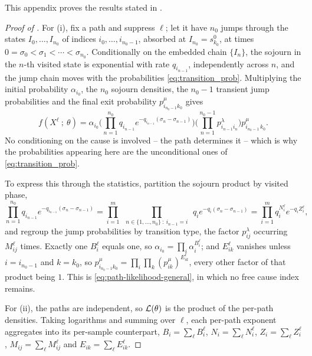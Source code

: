 \documentclass{article}
\begin{document}
This appendix proves the results stated in .

\begin{proof}[Proof of ]
For \textup{(i)}, fix a path and suppress $\ell$; let it have $n_0$ jumps through the states
$I_0,\ldots,I_{n_0}$ of indices $i_0,\ldots,i_{n_0-1}$, absorbed at $I_{n_0}=s^0_{k_0}$, at times
$0=\sigma_0<\sigma_1<\cdots<\sigma_{n_0}$. Conditionally on the embedded chain $\{I_n\}$, the sojourn
in the $n$-th visited state is exponential with rate $q_{i_{n-1}}$, independently across $n$, and the
jump chain moves with the probabilities \eqref{eq:transition_prob}. Multiplying the initial
probability $\alpha_{i_0}$, the $n_0$ sojourn densities, the $n_0-1$ transient jump probabilities and
the final exit probability $p^\mu_{i_{n_0-1}k_0}$ gives
%
\begin{equation}
\label{eq:path-likelihood-raw}
f(X^\ell~;~\theta)
=
\alpha_{i_0}
\Big(
\prod_{n=1}^{n_0} q_{i_{n-1}} e^{-q_{i_{n-1}}(\sigma_n-\sigma_{n-1})}
\Big)
\Big(
\prod_{n=1}^{n_0-1} p^\lambda_{i_{n-1} i_n}
\Big)
p^\mu_{i_{n_0-1}\,k_0}.
\end{equation}
%
No conditioning on the cause is involved -- the path determines it -- which is why the probabilities
appearing here are the unconditional ones of \eqref{eq:transition_prob}.

To express this through the statistics, partition the sojourn product by visited phase,
\[
\prod_{n=1}^{n_{0}} q_{i_{n-1}}e^{-q_{i_{n-1}}(\sigma_n-\sigma_{n-1})} = \prod_{i=1}^m ~~\prod_{n \in \{1,\ldots,n_0\} ~:~ i_{n-1} = i} ~~q_{i}e^{-q_{i}(\sigma_n-\sigma_{n-1})}
=
\prod_{i=1}^m
q_i^{N_i^\ell} e^{-q_i Z_i^\ell},
\]
and regroup the jump probabilities by transition type, the factor $p^\lambda_{ij}$ occurring
$M^\ell_{ij}$ times. Exactly one $B^\ell_i$ equals one, so $\alpha_{i_0}=\prod_i\alpha_i^{B^\ell_i}$;
and $E^\ell_{ik}$ vanishes unless $i=i_{n_0-1}$ and $k=k_0$, so
$p^\mu_{i_{n_0-1}k_0}=\prod_i\prod_k (p^\mu_{ik})^{E^\ell_{ik}}$, every other factor of that product
being $1$. This is \eqref{eq:path-likelihood-general}, in which no free cause index remains.

For \textup{(ii)}, the paths are independent, so ${\cal L}(\theta)$ is the product of the per-path
densities. Taking logarithms and summing over $\ell$, each per-path exponent aggregates into its
per-sample counterpart, $B_i=\sum_\ell B^\ell_i$, $N_i=\sum_\ell N^\ell_i$, $Z_i=\sum_\ell Z^\ell_i$,
$M_{ij}=\sum_\ell M^\ell_{ij}$ and $E_{ik}=\sum_\ell E^\ell_{ik}$.
\end{proof}
\end{document}
